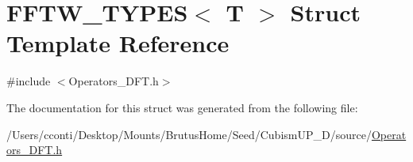 \hypertarget{struct_f_f_t_w___t_y_p_e_s}{}\section{F\+F\+T\+W\+\_\+\+T\+Y\+P\+E\+S$<$ T $>$ Struct Template Reference}
\label{struct_f_f_t_w___t_y_p_e_s}


{\ttfamily \#include $<$Operators\+\_\+\+D\+F\+T.\+h$>$}



The documentation for this struct was generated from the following file\+:\begin{DoxyCompactItemize}
\item 
/\+Users/cconti/\+Desktop/\+Mounts/\+Brutus\+Home/\+Seed/\+Cubism\+U\+P\+\_\+D/source/\hyperlink{_operators___d_f_t_8h}{Operators\+\_\+\+D\+F\+T.\+h}\end{DoxyCompactItemize}
